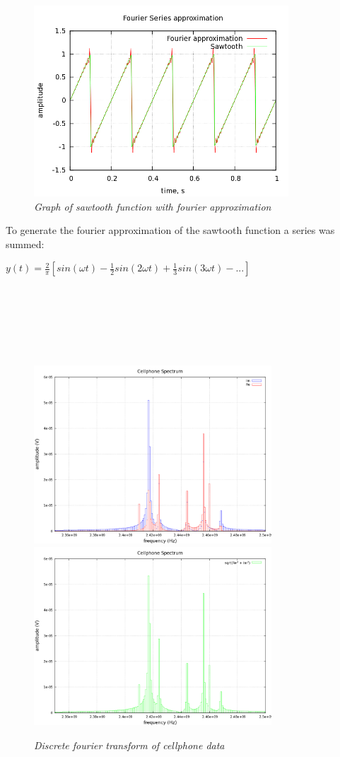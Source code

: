 \documentclass[11pt]{article}
\begin{document}
\begin{figure}[H]
  \begin{center}
\centerline{\includegraphics[width=3.75in]{Sawtoothfinal1.png}}
\caption{\it \small{Graph of sawtooth function with fourier approximation \label{fig2}}}
  \end{center}
\end{figure}
To generate the fourier approximation of the sawtooth function a series was summed:
\begin{center}
 $y(t) = \frac{2}{\pi}[sin(\omega t) - \frac{1}{2}sin(2\omega t) + \frac{1}{3}sin(3\omega t) - ... ]$
\end{center}
 ~\\
 ~\\
 ~\\
 ~\\
 ~\\
\begin{figure}[H]
 \centerline{\includegraphics[width=3.5in]{cellphone2.png}\includegraphics[width=3.5in]{cellphonesquared2.png}}
\caption{\it \small{Discrete fourier transform of cellphone data \label{fig5}}}
\end{figure}
\end{document}
